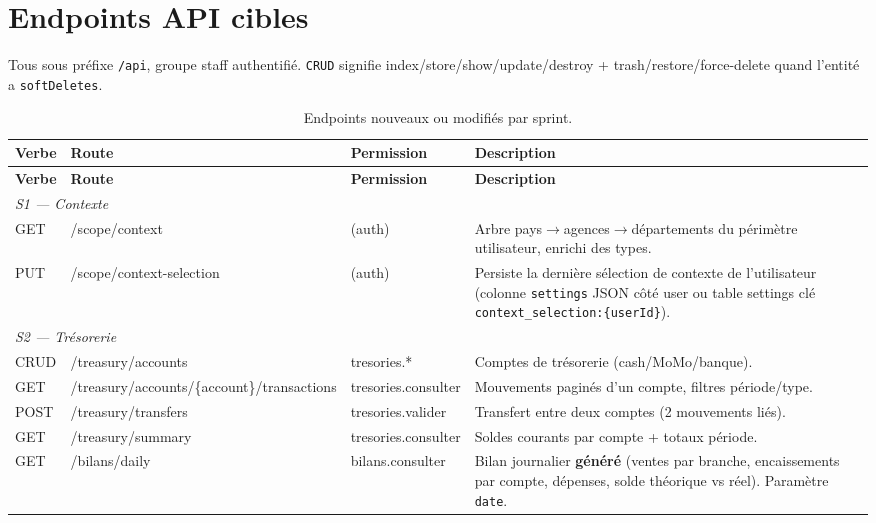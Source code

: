 \documentclass[11pt,a4paper]{article}
\begin{document}
\section{Endpoints API cibles}\label{sec:endpoints}

Tous sous préfixe \verb|/api|, groupe staff authentifié. \verb|CRUD| signifie index/store/show/update/destroy + trash/restore/force-delete quand l'entité a \verb|softDeletes|.

\begin{longtable}{|p{1.3cm}|p{4.6cm}|p{2.7cm}|p{6.8cm}|}
\caption{Endpoints nouveaux ou modifiés par sprint.} \\
\hline
\rowcolor{peklight}\textbf{Verbe} & \textbf{Route} & \textbf{Permission} & \textbf{Description} \\
\hline
\endfirsthead
\hline
\rowcolor{peklight}\textbf{Verbe} & \textbf{Route} & \textbf{Permission} & \textbf{Description} \\
\hline
\endhead
\multicolumn{4}{|l|}{\cellcolor{peklight}\textit{S1 --- Contexte}} \\ \hline
GET & /scope/context & (auth) & Arbre pays$\rightarrow$agences$\rightarrow$départements du périmètre utilisateur, enrichi des types. \\ \hline
PUT & /scope/context-selection & (auth) & Persiste la dernière sélection de contexte de l'utilisateur (colonne \texttt{settings} JSON côté user ou table settings clé \texttt{context\_selection:\{userId\}}). \\ \hline
\multicolumn{4}{|l|}{\cellcolor{peklight}\textit{S2 --- Trésorerie}} \\ \hline
CRUD & /treasury/accounts & tresories.* & Comptes de trésorerie (cash/MoMo/banque). \\ \hline
GET & /treasury/accounts/\{account\}/transactions & tresories.consulter & Mouvements paginés d'un compte, filtres période/type. \\ \hline
POST & /treasury/transfers & tresories.valider & Transfert entre deux comptes (2 mouvements liés). \\ \hline
GET & /treasury/summary & tresories.consulter & Soldes courants par compte + totaux période. \\ \hline
GET & /bilans/daily & bilans.consulter & Bilan journalier \textbf{généré} (ventes par branche, encaissements par compte, dépenses, solde théorique vs réel). Paramètre \texttt{date}. \\ \hline

\end{longtable}
\end{document}

